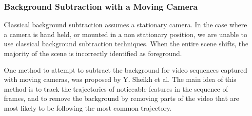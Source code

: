 \subsubsection{Background Subtraction with a Moving Camera}

Classical background subtraction assumes a stationary camera. In the case where a camera is hand held, or mounted in a non stationary position, we are unable to use classical background subtraction techniques. When the entire scene shifts, the majority of the scene is incorrectly identified as foreground.

One method to attempt to subtract the background for video sequences captured with moving cameras, was proposed by Y. Sheikh et al\cite{bgsubmove}. The main idea of this method is to track the trajectories of noticeable features in the sequence of frames, and to remove the background by removing parts of the video that are most likely to be following the most common trajectory.